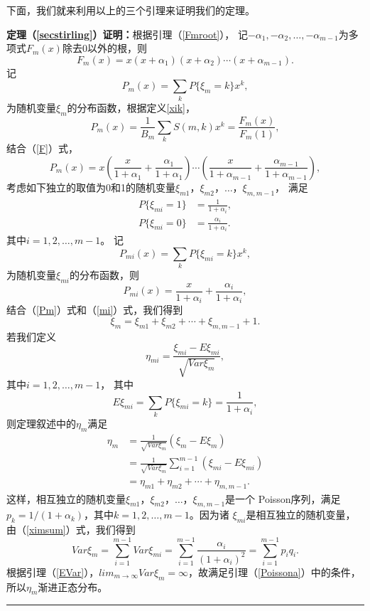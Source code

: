 \documentclass[a4paper,11pt,twoside]{book}
\def\qed{\nopagebreak\hfill{\rule{4pt}{7pt}}\medbreak}
\begin{document}
下面，我们就来利用以上的三个引理来证明我们的定理。

 \noindent
{\bf{定理（\ref{secstirling}）证明：}}根据引理（\ref{Fmroot}），
记$-\alpha_1,-\alpha_2,\ldots,-\alpha_{m-1}$为多项式$F_m(x)$除去0以外的根，则
\begin{equation}\label{F}
F_m(x)=x(x+\alpha_1)(x+\alpha_2)\cdots(x+\alpha_{m-1}).
\end{equation}
记
\begin{equation*}
P_m(x)=\sum\limits_kP\{\xi_m=k\}x^k,
\end{equation*}
为随机变量$\xi_m$的分布函数，根据定义\ref{xik}，
\begin{equation*}
P_m(x)=\frac{1}{B_m}\sum\limits_kS(m,k)x^k=\frac{F_m(x)}{F_m(1)},
\end{equation*}
结合（\ref{F}）式，
\begin{equation}\label{Pm}
P_m(x)=x\left(\frac{x}{1+\alpha_1}+\frac{\alpha_1}{1+\alpha_1}\right)\cdots
\left(\frac{x}{1+\alpha_{m-1}}+\frac{\alpha_{m-1}}{1+\alpha_{m-1}}\right),
\end{equation}
考虑如下独立的取值为0和1的随机变量$\xi_{m1}$，$\xi_{m2}$，$\ldots$，$\xi_{m,m-1}$，
满足
\begin{align*}
P\{\xi_{mi}=1\}&=\frac{1}{1+\alpha_i},\\
P\{\xi_{mi}=0\}&=\frac{\alpha_i}{1+\alpha_i}.
\end{align*}
其中$i=1,2,\ldots,m-1$。 记
\begin{equation*}
P_{mi}(x)=\sum\limits_kP\{\xi_{mi}=k\}x^k,
\end{equation*}
为随机变量$\xi_{mi}$的分布函数，则
\begin{equation}\label{mi}
P_{mi}(x)=\frac{x}{1+\alpha_i}+\frac{\alpha_i}{1+\alpha_i},
\end{equation}
结合（\ref{Pm}）式和（\ref{mi}）式，我们得到
\begin{equation}\label{ximsum}
\xi_m=\xi_{m1}+\xi_{m2}+\cdots+\xi_{m,m-1}+1.
\end{equation}
若我们定义
\begin{equation*}
\eta_{mi}=\frac{\xi_{mi}-E\xi_{mi}}{\sqrt{Var\xi_m}},
\end{equation*}
其中$i=1,2,\ldots,m-1$， 其中
\[
E\xi_{mi}=\sum\limits_kP\{\xi_{mi}=k\}=\frac{1}{1+\alpha_i},
\]
则定理叙述中的$\eta_m$满足
\begin{align*}
\eta_m&=\frac{1}{\sqrt{Var\xi_m}}\left(\xi_m-E\xi_m\right)\\
&=\frac{1}{\sqrt{Var\xi_m}}\sum\limits_{i=1}^{m-1}\left(\xi_{mi}-E\xi_{mi}\right)\\
&=\eta_{m1}+\eta_{m2}+\cdots+\eta_{m,m-1}.
\end{align*}
这样，相互独立的随机变量$\xi_{m1}$，$\xi_{m2}$，$\ldots$，$\xi_{m,m-1}$是一个
Poisson序列，满足$p_k=1/(1+\alpha_k)$，其中$k=1,2,\ldots,m-1$。因为诸
$\xi_{mi}$是相互独立的随机变量，由（\ref{ximsum}）式，我们得到
\[
Var\xi_m=\sum\limits_{i=1}^{m-1}Var\xi_{mi}=\sum\limits_{i=1}^{m-1}\frac{\alpha_i}
{(1+\alpha_i)^2}=\sum\limits_{i=1}^{m-1}p_iq_i.
\]
根据引理（\ref{EVar}），$lim_{m\rightarrow
\infty}Var\xi_m=\infty$，故满足引理（\ref{Poissona}）中的条件，所以$\eta_m$渐进正态分布。
\qed
\end{document}
